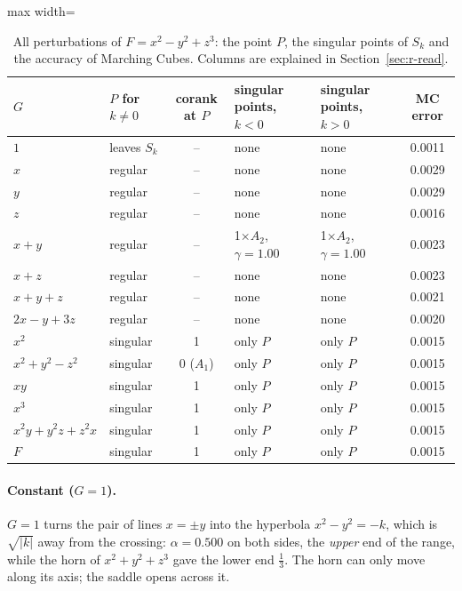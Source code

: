\documentclass[12pt, a4paper]{article}
\theoremstyle{plain}
\theoremstyle{definition}
\theoremstyle{remark}
\theoremstyle{definition}
\begin{document}
\begin{table}[!h]
\centering
\footnotesize
\begin{adjustbox}{max width=\textwidth}
\begin{tabular}{l l c l l c}
\toprule
$G$ & $P$ for $k\neq0$ & corank at $P$ & singular points, $k<0$ & singular points, $k>0$ & MC error \\
\midrule
$1$ & leaves $S_k$ & -- & none & none & 0.0011 \\
$x$ & regular & -- & none & none & 0.0029 \\
$y$ & regular & -- & none & none & 0.0029 \\
$z$ & regular & -- & none & none & 0.0016 \\
$x+y$ & regular & -- & 1$\times$$A_2$, $\gamma=1.00$ & 1$\times$$A_2$, $\gamma=1.00$ & 0.0023 \\
$x+z$ & regular & -- & none & none & 0.0023 \\
$x+y+z$ & regular & -- & none & none & 0.0021 \\
$2x-y+3z$ & regular & -- & none & none & 0.0020 \\
$x^2$ & singular & 1 & only $P$ & only $P$ & 0.0015 \\
$x^2+y^2-z^2$ & singular & 0 ($A_1$) & only $P$ & only $P$ & 0.0015 \\
$xy$ & singular & 1 & only $P$ & only $P$ & 0.0015 \\
$x^3$ & singular & 1 & only $P$ & only $P$ & 0.0015 \\
$x^2y+y^2z+z^2x$ & singular & 1 & only $P$ & only $P$ & 0.0015 \\
$F$ & singular & 1 & only $P$ & only $P$ & 0.0015 \\
\bottomrule
\end{tabular}
\end{adjustbox}
\caption[Singular points for $x^2-y^2+z^3$]{All perturbations of $F=x^2-y^2+z^3$: the point $P$, the singular points of $S_k$ and the accuracy of Marching Cubes. Columns are explained in Section~\ref{sec:r-read}.}
\label{tab:r-A2b-points}
\end{table}
\paragraph{Constant ($G=1$).} $G=1$ turns the pair of lines $x=\pm y$ into the
hyperbola $x^2-y^2=-k$, which is $\sqrt{|k|}$ away from the crossing: $\alpha=0.500$ on
both sides, the \emph{upper} end of the range, while the horn of $x^2+y^2+z^3$ gave
the lower end $\tfrac13$. The horn can only move along its axis; the saddle opens
across it.
\end{document}
